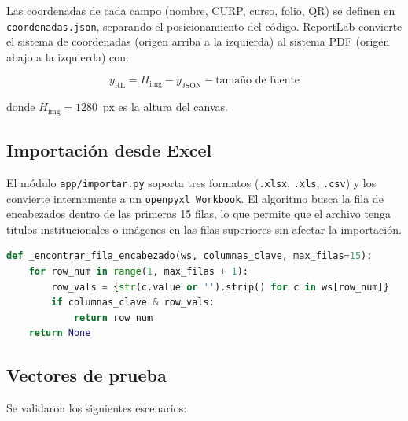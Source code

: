 \documentclass[11pt,letterpaper]{article}
\begin{document}
Las coordenadas de cada campo (nombre, CURP, curso, folio, QR) se definen en
\texttt{coordenadas.json}, separando el posicionamiento del c\'odigo. ReportLab
convierte el sistema de coordenadas (origen arriba a la izquierda) al sistema PDF
(origen abajo a la izquierda) con:

\begin{equation}
  y_{\text{RL}} = H_{\text{img}} - y_{\text{JSON}} - \text{tama\~no de fuente}
  \label{eq:coord}
\end{equation}

donde $H_{\text{img}} = 1280$~px es la altura del canvas.

\subsection{Importaci\'on desde Excel}

El m\'odulo \texttt{app/importar.py} soporta tres formatos (\texttt{.xlsx},
\texttt{.xls}, \texttt{.csv}) y los convierte internamente a un \texttt{openpyxl
Workbook}. El algoritmo busca la fila de encabezados dentro de las primeras 15 filas,
lo que permite que el archivo tenga t\'itulos institucionales o im\'agenes en las
filas superiores sin afectar la importaci\'on.

\begin{lstlisting}[language=Python,
  caption={Detecci\'on autom\'atica de la fila de encabezados. Tolera archivos con
           metadatos en las primeras filas.},
  label={lst:header}]
def _encontrar_fila_encabezado(ws, columnas_clave, max_filas=15):
    for row_num in range(1, max_filas + 1):
        row_vals = {str(c.value or '').strip() for c in ws[row_num]}
        if columnas_clave & row_vals:
            return row_num
    return None
\end{lstlisting}

\subsection{Vectores de prueba}

Se validaron los siguientes escenarios:
\end{document}
